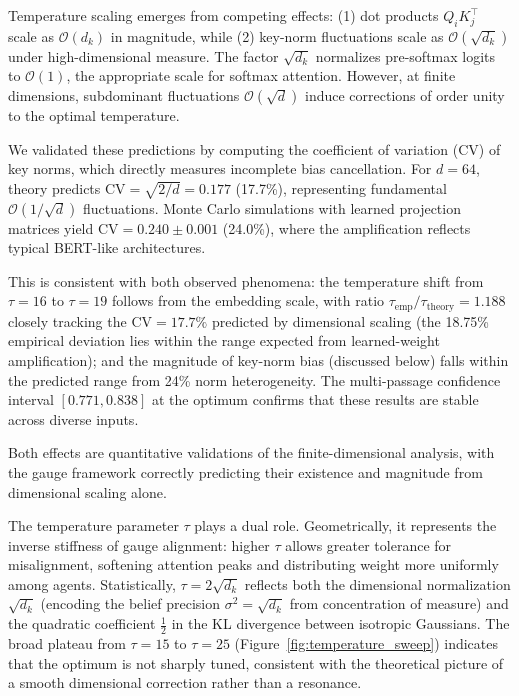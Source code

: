 \documentclass[twoside,11pt]{article}
\begin{document}
Temperature scaling emerges from competing effects: (1) dot products $Q_i K_j^\top$ scale as $\mathcal{O}(d_k)$ in magnitude, while (2) key-norm fluctuations scale as $\mathcal{O}(\sqrt{d_k})$ under high-dimensional measure. The factor $\sqrt{d_k}$ normalizes pre-softmax logits to $\mathcal{O}(1)$, the appropriate scale for softmax attention. However, at finite dimensions, subdominant fluctuations $\mathcal{O}(\sqrt{d})$ induce corrections of order unity to the optimal temperature.

We validated these predictions by computing the coefficient of variation (CV) of key norms, which directly measures incomplete bias cancellation. For $d = 64$, theory predicts $\text{CV} = \sqrt{2/d} = 0.177$ (17.7\%), representing fundamental $\mathcal{O}(1/\sqrt{d})$ fluctuations. Monte Carlo simulations with learned projection matrices yield $\text{CV} = 0.240 \pm 0.001$ (24.0\%), where the amplification reflects typical BERT-like architectures.

This is consistent with both observed phenomena: the temperature shift from $\tau = 16$ to $\tau = 19$ follows from the embedding scale, with ratio $\tau_{\text{emp}}/\tau_{\text{theory}} = 1.188$ closely tracking the $\text{CV} = 17.7\%$ predicted by dimensional scaling (the 18.75\% empirical deviation lies within the range expected from learned-weight amplification); and the magnitude of key-norm bias (discussed below) falls within the predicted range from 24\% norm heterogeneity. The multi-passage confidence interval $[0.771, 0.838]$ at the optimum confirms that these results are stable across diverse inputs.

Both effects are quantitative validations of the finite-dimensional analysis, with the gauge framework correctly predicting their existence and magnitude from dimensional scaling alone.

The temperature parameter $\tau$ plays a dual role. Geometrically, it represents the inverse stiffness of gauge alignment: higher $\tau$ allows greater tolerance for misalignment, softening attention peaks and distributing weight more uniformly among agents. Statistically, $\tau = 2\sqrt{d_k}$ reflects both the dimensional normalization $\sqrt{d_k}$ (encoding the belief precision $\sigma^2 = \sqrt{d_k}$ from concentration of measure) and the quadratic coefficient $\frac{1}{2}$ in the KL divergence between isotropic Gaussians. The broad plateau from $\tau = 15$ to $\tau = 25$ (Figure~\ref{fig:temperature_sweep}) indicates that the optimum is not sharply tuned, consistent with the theoretical picture of a smooth dimensional correction rather than a resonance.
\end{document}
